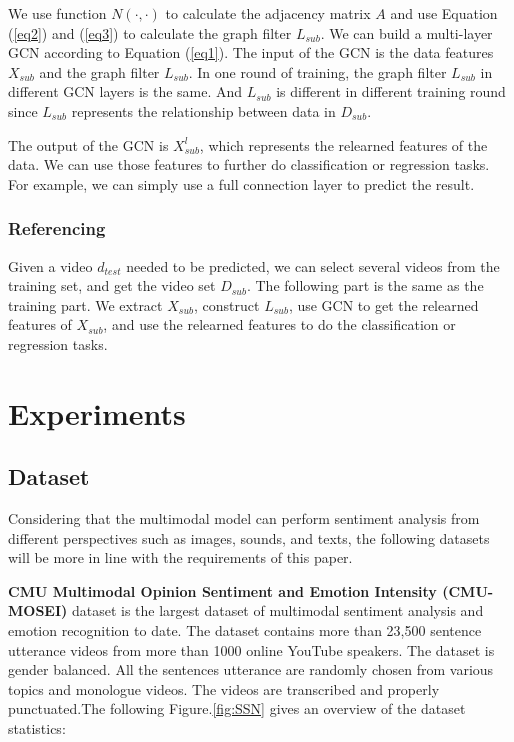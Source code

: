 \documentclass[11pt]{article}
\begin{document}
We use function $N(\cdot,\cdot)$  to calculate the adjacency matrix $A$ and use Equation (\ref{eq2}) and (\ref{eq3}) to calculate the graph filter $L_{sub}$. We can build a multi-layer GCN according to Equation (\ref{eq1}). The input of the GCN is the data features $X_{sub}$ and the graph filter $L_{sub}$. In one round of training, the graph filter $L_{sub}$ in different GCN layers is the same. And $L_{sub}$ is different in different training round since $L_{sub}$ represents the relationship between data in $D_{sub}$.

The output of the GCN is $X_{sub}^{l}$, which represents the relearned features of the data. We can use those features to further do classification or regression tasks. For example, we can simply use a full connection layer to predict the result.

\subsubsection{Referencing}

Given a video $d_{test}$ needed to be predicted, we can select several videos from the training set, and get the video set $D_{sub}$. The following part is the same as the training part. We extract $X_{sub}$, construct $L_{sub}$, use GCN to get the relearned features of $X_{sub}$, and use the relearned features to do the classification or regression tasks.


\section{Experiments}

\subsection{Dataset}

Considering that the multimodal model can perform sentiment analysis from different perspectives such as images, sounds, and texts, the following datasets will be more in line with the requirements of this paper.

\textbf{CMU Multimodal Opinion Sentiment and Emotion Intensity (CMU-MOSEI)}  dataset is the largest dataset of multimodal sentiment analysis and emotion recognition to date. The dataset contains more than 23,500 sentence utterance videos from more than 1000 online YouTube speakers. The dataset is gender balanced. All the sentences utterance are randomly chosen from various topics and monologue videos. The videos are transcribed and properly punctuated.The following Figure.\ref{fig:SSN} gives an overview of the dataset statistics:
\end{document}
